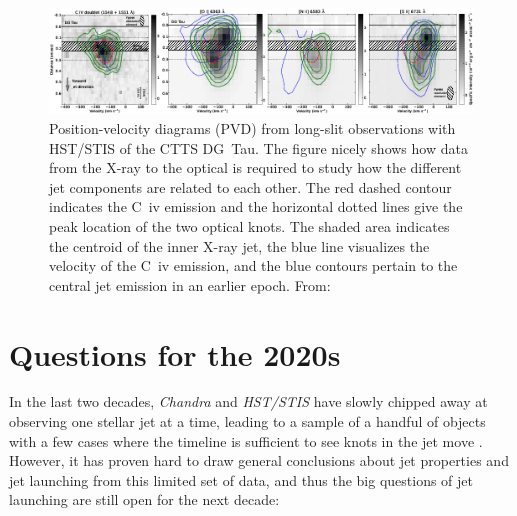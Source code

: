 \documentclass[12pt]{article}
\begin{document}
\begin{figure}[htb]
\centering
\includegraphics[width=\textwidth]{aa18592-11-fig2.png}
\caption{Position-velocity diagrams (PVD) from long-slit observations with HST/STIS of the CTTS DG~Tau. The figure nicely shows how data from the X-ray to the optical is required to study how the different jet components are related to each other. The red dashed contour indicates the C~{\sc iv} emission and the horizontal dotted lines give the peak location of the two optical knots. The shaded area indicates the centroid of the inner X-ray jet, the blue line visualizes the velocity of the C~{\sc iv} emission, and the blue contours pertain to the central jet emission in an earlier epoch. From: }
\label{fig:CIV}
\end{figure}


\section{Questions for the 2020s}
In the last two decades, \emph{Chandra} and \emph{HST/STIS} have slowly chipped away at observing one stellar jet at a time, leading to a sample of a handful of objects with a few cases where the timeline is sufficient to see knots in the jet move \citep[e.g.][]{2011A&A...530A.123S}. However, it has proven hard to draw general conclusions about jet properties and jet launching from this limited set of data, and thus the big questions of jet launching are still open for the next decade:
\end{document}
